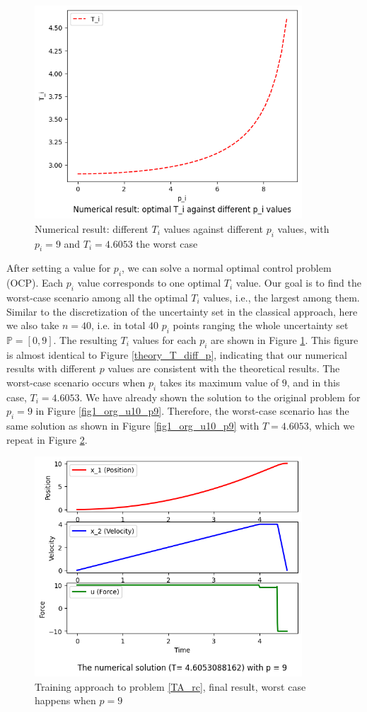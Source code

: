 \documentclass  [
  paper    = a4,
  BCOR     = 10mm,
  twoside,
  fontsize = 12pt,
  fleqn,
  toc      = bibnumbered,
  toc      = listofnumbered,
  numbers  = noendperiod,
  headings = normal,
  listof   = leveldown,
  version  = 3.03
]                                       {scrreprt}
\newcommand{\<}{\langle}
\renewcommand{\>}{\rangle}
\begin{document}
\begin{figure}[H]
	\centerline{\includegraphics[width=10cm]{numerical_T_p.png}}
	\caption{Numerical result: different $T_i$ values against different $p_i$ values, with $p_i=9$ and  $T_i=4.6053$ the worst case}
	\label{fig_ta_numerical_T_p}
\end{figure}

After setting a value for $p_i$, we can solve a normal optimal control problem (OCP). Each $p_i$ value corresponds to one optimal $T_i$ value. Our goal is to find the worst-case scenario among all the optimal $T_i$ values, i.e., the largest among them. Similar to the discretization of the uncertainty set in the classical approach, here we also take $n=40$, i.e. in total $40$ $p_i$ points ranging the whole uncertainty set $\mathbb{P}=[0,9]$.  The resulting $T_i$ values for each $p_i$ are shown in Figure \ref{fig_ta_numerical_T_p}. This figure is almost identical to Figure \ref{theory_T_diff_p}, indicating that our numerical results with different $p$ values are consistent with the theoretical results. The worst-case scenario occurs when $p_i$ takes its maximum value of $9$, and in this case, $T_i=4.6053$. We have already shown the solution to the original problem for $p_i=9$ in Figure \ref{fig1_org_u10_p9}. Therefore, the worst-case scenario has the same solution as shown in Figure \ref{fig1_org_u10_p9} with $T=4.6053$, which we repeat in Figure \ref{fig1_ta_final}.

\begin{figure}[h]
	\centerline{\includegraphics[width=10cm]{original_u10_p9.png}}
	\caption{Training approach to problem \ref{TA_rc}, final result, worst case happens when $p=9$}
	\label{fig1_ta_final}
\end{figure}
\end{document}
